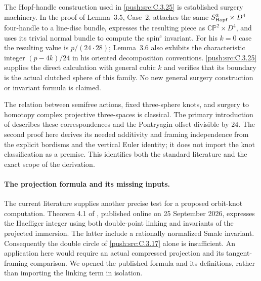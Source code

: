 \begin{remark}
The Hopf-handle construction used in \ref{push:src:C.3.25} is established
surgery machinery. In the proof of Lemma~3.5, Case~2,
\citet{Jiang2014E} attaches the same
$S^3_{\rm Hopf}\times D^4$ four-handle to a line-disc bundle,
expresses the resulting piece as $\mathbb{CP}^2\times D^4$,
and uses its trivial normal bundle to compute the spin$^c$
invariant. For his $k=0$ case the resulting value is
$p/(24\cdot28)$; Lemma~3.6 also exhibits the characteristic
integer $(p-4k)/24$ in his oriented decomposition conventions.
\ref{push:src:C.3.25} supplies the direct calculation with general cubic
$k$ and verifies that its boundary is the actual clutched
sphere of this family. No new general surgery construction
or invariant formula is claimed.

The relation between semifree actions, fixed three-sphere
knots, and surgery to homotopy complex projective three-spaces
is classical. The primary introduction of
\citet[pp.~125--126]{MontgomeryYang1968E} describes these
correspondences and the Pontryagin offset divisible by $24$.
The second proof here derives its needed additivity and
framing independence from the explicit bordisms and the
vertical Euler identity; it does not import the knot
classification as a premise. This identifies both the
standard literature and the exact scope of the derivation.
\end{remark}


\paragraph{The projection formula and its missing inputs.}
The current literature supplies another precise test for a proposed
orbit-knot computation. Theorem 4.1 of
\citet{GauniyalTurchin2026Root}, published online on
25 September 2026, expresses the Haefliger integer using both
double-point linking and invariants of the projected immersion.
The latter include a rationally normalized Smale invariant.
Consequently the double circle of \ref{push:src:C.3.17} alone is insufficient.
An application here would require an actual compressed projection
and its tangent-framing comparison. We opened the published
formula and its definitions, rather than importing the linking
term in isolation.

